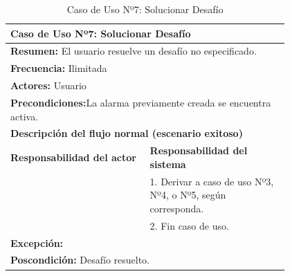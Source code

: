 \begin{table}[H]
    \centering
    \caption{Caso de Uso Nº7: Solucionar Desafío}
    
    \begin{tabular}{| p{0.4\linewidth} | p{0.4\linewidth} |}
        \hline
        \multicolumn{2}{|l|}{\textbf{Caso de Uso Nº7:} Solucionar Desafío} \\
        \hline
        \multicolumn{2}{|l|}{\textbf{Resumen:} El usuario resuelve un desafío no especificado.} \\
        \hline
        \multicolumn{2}{|l|}{\textbf{Frecuencia:}  Ilimitada} \\
        \hline
        \multicolumn{2}{|l|}{\textbf{Actores:}  Usuario} \\
        \hline
        \multicolumn{2}{|l|}{\textbf{Precondiciones:}La alarma previamente creada se encuentra activa.} \\
        \hline
        \multicolumn{2}{|l|}{\textbf{Descripción del flujo normal (escenario exitoso)} } \\
        \hline
        \textbf{Responsabilidad del actor} & \textbf{Responsabilidad del sistema}\\
            & 1. Derivar a caso de uso Nº3, Nº4, o Nº5, según corresponda.\\
            & 2. Fin caso de uso. \\
        \hline
        \multicolumn{2}{|p{0.8\linewidth}|}{
            \textbf{Excepción:}}\\
        \hline
        \multicolumn{2}{|l|}{\textbf{Poscondición:}  Desafío resuelto.} \\
        \hline
    \end{tabular}

    \label{table:7}
\end{table}


